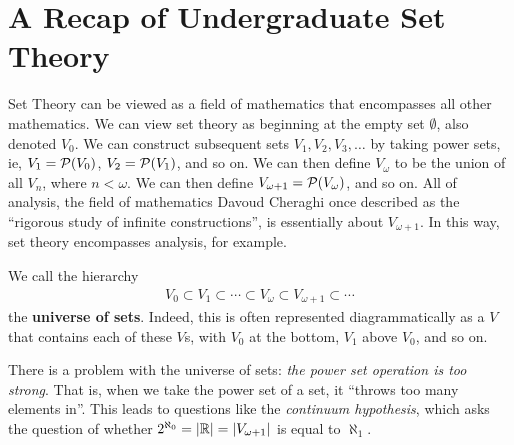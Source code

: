 
\chapter{A Recap of Undergraduate Set Theory} \label{Ch1:CH}
\thispagestyle{empty}

Set Theory can be viewed as a field of mathematics that encompasses all other mathematics. We can view set theory as beginning at the empty set $\emptyset$, also denoted $V_0$. We can construct subsequent sets $V_1, V_2, V_3, \ldots$ by taking power sets, ie, $V_1 = \mathcal{P}\!\left( V_0 \right)$, $V_2 = \mathcal{P}\!\left( V_1 \right)$, and so on. We can then define $V_{\omega}$ to be the union of all $V_n$, where $n < \omega$. We can then define $V_{\omega + 1} = \mathcal{P}\!\left( V_{\omega} \right)$, and so on. All of analysis, the field of mathematics Davoud Cheraghi once described as the ``rigorous study of infinite constructions'', is essentially about $V_{\omega + 1}$. In this way, set theory encompasses analysis, for example.

We call the hierarchy
\begin{align*}
    V_0 \subset V_1 \subset \cdots \subset V_{\omega} \subset V_{\omega + 1} \subset \cdots
\end{align*}
the \textbf{universe of sets}. Indeed, this is often represented diagrammatically as a $V$ that contains each of these $V$s, with $V_0$ at the bottom, $V_1$ above $V_0$, and so on.

There is a problem with the universe of sets: \textit{the power set operation is too strong}. That is, when we take the power set of a set, it ``throws too many elements in''. This leads to questions like the \textit{continuum hypothesis}, which asks the question of whether $2^{\aleph_0} = \left\lvert \mathbb{R} \right\rvert = \left\lvert V_{\omega + 1} \right\rvert$ is equal to $\aleph_1$.

